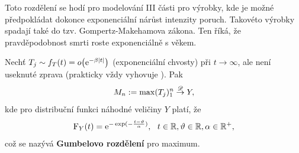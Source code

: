     Toto rozdělení se hodí pro modelování III části pro výrobky, kde je možné předpokládat dokonce exponenciální nárůst intenzity poruch. Takovéto výrobky spadají také do tzv. Gompertz-Makehamova zákona. Ten říká, že pravděpodobnost smrti roste exponenciálně s věkem.

    \begin{define}
        Nechť $T_j \sim f_T(t) = o\big(\mathrm{e}^{-\beta\left|t\right|} \big)$ (exponenciální chvosty) při $t \rightarrow \infty$, ale není useknuté zprava (prakticky vždy vyhovuje ). Pak 
        $$ M_n:=\max(T_j)_1^n  \stackrel{\mathscr{D}}{\to} Y  ,$$ kde
        pro distribuční funkci náhodné veličiny $Y$ platí, že	
        $$ \mathrm{F}_Y(t)  = \mathrm{e}^{-\exp(-\frac{t-\vartheta}{\alpha} )},~~t \in \mathbb{R}, \vartheta \in \mathbb{R}, \alpha \in\mathbb{R}^+,  $$
        což se nazývá \textbf{Gumbelovo rozdělení} pro maximum.
    \end{define}
    
